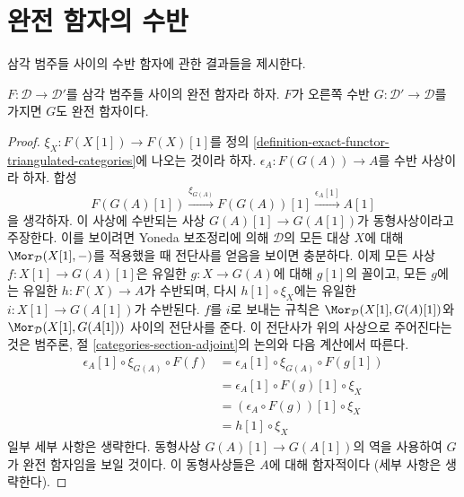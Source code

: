 \section{완전 함자의 수반}
\label{section-adjoints}

\noindent
삼각 범주들 사이의 수반 함자에 관한 결과들을 제시한다.

\begin{lemma}
\label{lemma-adjoint-is-exact}
$F : \mathcal{D} \to \mathcal{D}'$를 삼각 범주들 사이의 완전
함자라 하자. $F$가 오른쪽 수반
$G: \mathcal{D'} \to \mathcal{D}$를 가지면 $G$도 완전 함자이다.
\end{lemma}

\begin{proof}
$\xi_X : F(X[1]) \to F(X)[1]$를 정의
\ref{definition-exact-functor-triangulated-categories}에 나오는 것이라
하자. $\epsilon_A : F(G(A)) \to A$를 수반 사상이라 하자.
합성
$$
F(G(A)[1]) \xrightarrow{\xi_{G(A)}} F(G(A))[1] \xrightarrow{\epsilon_A[1]} A[1]
$$
을 생각하자. 이 사상에 수반되는 사상 $G(A)[1] \to G(A[1])$가
동형사상이라고 주장한다. 이를 보이려면 Yoneda 보조정리에 의해
$\mathcal{D}$의 모든 대상 $X$에 대해
$\Mor_\mathcal{D}(X[1], -)$를 적용했을 때 전단사를 얻음을 보이면
충분하다. 이제 모든 사상 $f : X[1] \to G(A)[1]$은 유일한
$g : X \to G(A)$에 대해 $g[1]$의 꼴이고, 모든 $g$에는 유일한
$h : F(X) \to A$가 수반되며, 다시 $h[1] \circ \xi_X$에는 유일한
$i : X[1] \to G(A[1])$가 수반된다. $f$를 $i$로 보내는 규칙은
$\Mor_\mathcal{D}(X[1], G(A)[1])$와
$\Mor_\mathcal{D}(X[1], G(A[1]))$ 사이의 전단사를 준다.
이 전단사가 위의 사상으로 주어진다는 것은 범주론, 절
\ref{categories-section-adjoint}의 논의와 다음 계산에서 따른다.
\begin{align*}
\epsilon_A[1] \circ \xi_{G(A)} \circ F(f)
& =
\epsilon_A[1] \circ \xi_{G(A)} \circ F(g[1]) \\
& =
\epsilon_A[1] \circ F(g)[1] \circ \xi_X \\
& = 
(\epsilon_A \circ F(g))[1] \circ \xi_X \\
& =
h[1] \circ \xi_X
\end{align*}
일부 세부 사항은 생략한다. 동형사상
$G(A)[1] \to G(A[1])$의 역을 사용하여 $G$가 완전 함자임을
보일 것이다. 이 동형사상들은 $A$에 대해 함자적이다
(세부 사항은 생략한다).


\end{proof}
